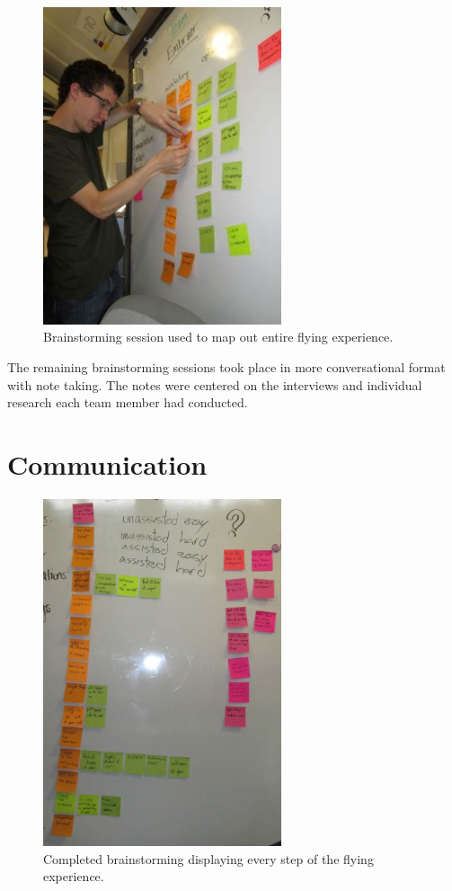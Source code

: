 \documentclass[a4paper, 12pt,conference]{new_cit_thesis}
\begin{document}
\begin{figure}[h]
  \centering
     \includegraphics[width=7cm]{images/image018}
   \caption{Brainstorming session used to map out entire flying experience.}
  \label{fig:18}
\end{figure}

The remaining brainstorming sessions took place in more conversational format with note taking.  The notes were centered on the interviews and individual research each team member had conducted.

\section{Communication}
\begin{figure}[h]
  \centering
     \includegraphics[width=7cm]{images/image019}
   \caption{Completed brainstorming displaying every step of the flying experience.}
  \label{fig:19}
\end{figure}
\end{document}
